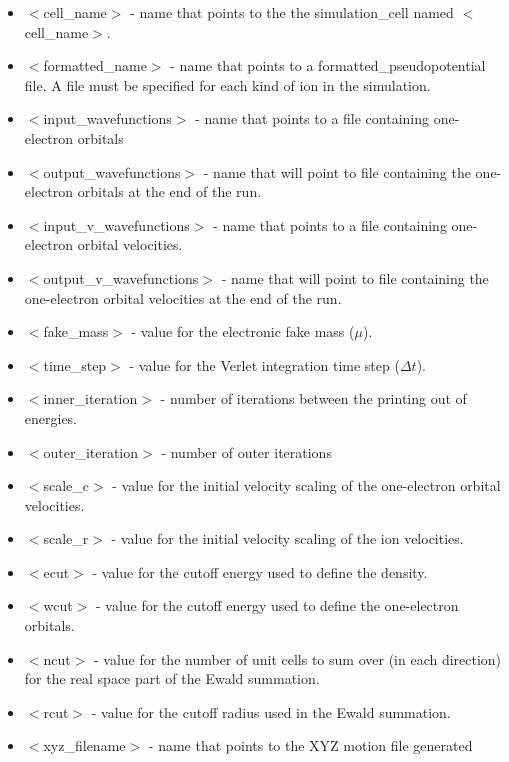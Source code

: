 \begin{itemize}
	\item $<$cell\_name$>$ - name that points to the
              the simulation\_cell named $<$cell\_name$>$.
	\item $<$formatted\_name$>$ - name that points
              to a formatted\_pseudopotential file.  A file must
              be specified for each kind of ion in the simulation.
	\item $<$input\_wavefunctions$>$ - name that points
              to a file containing one-electron orbitals
	\item $<$output\_wavefunctions$>$ - name that will
              point to file containing the one-electron orbitals at the
              end of the run. 
	\item $<$input\_v\_wavefunctions$>$ - name that points
              to a file containing one-electron orbital velocities.
	\item $<$output\_v\_wavefunctions$>$ - name that will
              point to file containing the one-electron orbital velocities
	      at the end of the run. 
	\item $<$fake\_mass$>$ - value for the electronic
              fake mass ($\mu$).
	\item $<$time\_step$>$ - value for the Verlet integration 
               time step ($\Delta t$).
	\item $<$inner\_iteration$>$ - number of iterations between the
              printing out of energies.
	\item $<$outer\_iteration$>$ - number of outer iterations
 	\item $<$scale\_c$>$ - value for the initial velocity
			      scaling of the one-electron orbital velocities.
	\item $<$scale\_r$>$ - value for the initial velocity
			      scaling of the ion velocities.
	\item $<$ecut$>$ - value for the cutoff energy used
                           to define the density.
	\item $<$wcut$>$ - value for the cutoff energy used
 			   to define the one-electron orbitals.
	\item $<$ncut$>$ - value for the number of unit cells
 			  to sum over (in each direction) for the real space
			  part of the Ewald summation.
	\item $<$rcut$>$ - value for the cutoff radius used
			  in the Ewald summation.
	\item $<$xyz\_filename$>$ - name that points to the XYZ motion file
				generated
\end{itemize}




